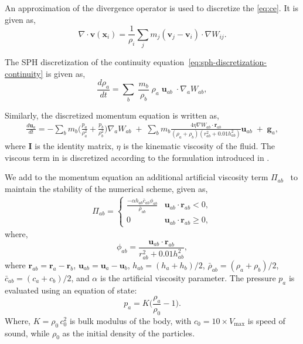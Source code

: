 \documentclass[preprint,12pt]{elsarticle}
\newcommand{\ten}[1]{\ensuremath{\mathbf{#1}}}
\begin{document}
An approximation of the divergence operator is used to discretize the
\cref{eq:ce}.  It is given as,
\begin{equation}
  \label{intro:eq:sph-continu-div-final}
  \nabla \cdot \ten{v}(\ten{x}_i) = \frac{1}{\rho_i} \sum_{j} m_j \left(\ten{v}_j - \ten{v}_i\right) \cdot \nabla W_{ij}.
\end{equation}


The SPH discretization of the continuity
equation~\cref{eq:sph-discretization-continuity} is given as,
\begin{equation}
  \label{eq:sph-discretization-continuity}
  \frac{{d}\rho_a}{dt} = \sum_{b} \; \frac{m_b}{\rho_{b}} \;
  \rho_{a} \; {\ten{u}}_{ab} \; \cdot \nabla_{a} W_{ab},
\end{equation}

%
Similarly, the discretized momentum equation is written as,
\begin{multline}
  \label{eq:sph-momentum-fluid}
  \frac{{d}\ten{u}_{a}}{dt} = - \sum_{b} m_b
  \bigg(\frac{p_a}{\rho_a^2} + \frac{p_b}{\rho_b^2}\bigg)
  \nabla_{a} W_{ab}
 \;+\;
  \sum_{b} m_b \frac{4 \eta \nabla W_{ab}\cdot
    \ten{r}_{ab}}{(\rho_a + \rho_b) (r_{ab}^2 + 0.01 h_{ab}^2)} \ten{u}_{ab}  \;+\;
  \ten{g}_{a},
\end{multline}
where $\ten{I}$ is the identity matrix, $\eta$ is the kinematic viscosity of the
fluid. The viscous term in  is discretized according to the
formulation introduced in \cite{morris1997modeling}.

We add to the momentum equation an additional artificial viscosity term
$\Pi_{ab}$~\cite{monaghan-review:2005} to maintain the stability of the
numerical scheme, given as,
\begin{align}
  \label{eq:mom-av}
  \Pi_{ab} =
  \begin{cases}
\frac{-\alpha h_{ab} \bar{c}_{ab} \phi_{ab}}{\bar{\rho}_{ab}}
  & \ten{u}_{ab}\cdot \ten{r}_{ab} < 0, \\
  0 & \ten{u}_{ab}\cdot \ten{r}_{ab} \ge 0,
\end{cases}
\end{align}
where,
%
\begin{equation}
  \label{eq:av-phiij}
  \phi_{ab} = \frac{\ten{u}_{ab} \cdot \ten{r}_{ab}}{r^2_{ab} + 0.01 h^2_{ab}},
\end{equation}
%
where $\ten{r}_{ab} = \ten{r}_a - \ten{r}_b$,
$\ten{u}_{ab} = \ten{u}_a - \ten{u}_b$, $h_{ab} = (h_a + h_b)/2$,
$\bar{\rho}_{ab} = (\rho_a + \rho_b)/2$, $\bar{c}_{ab} = (c_a + c_b) / 2$, and
$\alpha$ is the artificial viscosity parameter.  The pressure $p_a$ is evaluated
using an equation of state:
\begin{equation}
\label{eqn:sph-eos}
  p_a = K \bigg(\frac{\rho_a}{\rho_{0}} - 1 \bigg).
\end{equation}
Where, $K=\rho_0 \, c_0^2$ is bulk modulus of the body, with
$c_0=10 \times V_{\text{max}}$ is speed of sound, while $\rho_0$ as the
initial density of the particles.
\end{document}
